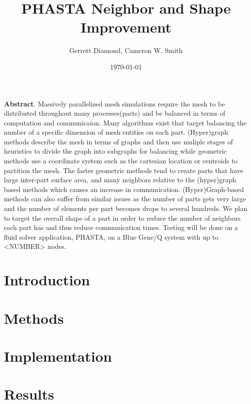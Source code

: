 \documentclass[a4paper]{article}
\title{PHASTA Neighbor and Shape Improvement}
\author{Gerrett Diamond, Cameron W. Smith}
\date{\today}
\begin{document}
\maketitle

\textbf{Abstract}. Massively parallelized mesh simulations require the mesh to be distributed throughout many processes(parts) and be balanced in terms of computation and communicaion. Many algorithms exist that target balancing the number of a specific dimension of mesh entities on each part. (Hyper)graph methods describe the mesh in terms of graphs and then use muliple stages of heuristics to divide the graph into subgraphs for balancing while geometric methods use a coordinate system such as the cartesian location or centroids to partition the mesh. The faster geometric methods tend to create parts that have large inter-part surface area, and many neighbors relative to the (hyper)graph based methods which causes an increase in communication. (Hyper)Graph-based methods can also suffer from similar issues as the number of parts gets very large and the number of elements per part becomes drops to several hundreds.  We plan to target the overall shape of a part in order to reduce the number of neighbors each part has and thus reduce communication times. Testing will be done on a fluid solver application, PHASTA, on a Blue Gene/Q system with up to <NUMBER> nodes.
 
\section{Introduction}

\section{Methods}


\section{Implementation}

\section{Results}

\newpage


\end{document}

